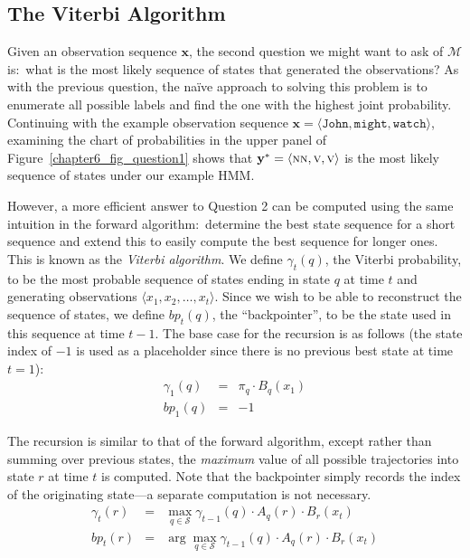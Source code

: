 \subsection{The Viterbi Algorithm}

Given an observation sequence $\mathbf{x}$, the second question we
might want to ask of $\mathcal{M}$ is:\ what is the most likely
sequence of states that generated the observations?  As with the
previous question, the na\"{i}ve approach to solving this problem is
to enumerate all possible labels and find the one with the highest
joint probability.  Continuing with the example observation sequence
$\textbf{x} = \langle \texttt{John} , \texttt{might} , \texttt{watch}
\rangle$, examining the chart of probabilities in the upper panel of
Figure~\ref{chapter6_fig_question1} shows that $\textbf{y}^* = \langle
\textsc{nn}, \textsc{v}, \textsc{v} \rangle$ is the most likely
sequence of states under our example HMM.

However, a more efficient answer to Question 2 can be computed using
the same intuition in the forward algorithm:\ determine the best state
sequence for a short sequence and extend this to easily compute the
best sequence for longer ones.  This is known as the \emph{Viterbi
  algorithm}.  We define $\gamma_t(q)$, the Viterbi probability, to be
the most probable sequence of states ending in state $q$ at time $t$
and generating observations $\langle x_1, x_2, \ldots , x_t \rangle$.
Since we wish to be able to reconstruct the sequence of states, we
define $bp_t(q)$, the ``backpointer'', to be the state used in this
sequence at time $t-1$.  The base case for the recursion is as follows
(the state index of $-1$ is used as a placeholder since there is no
previous best state at time $t=1$):
\begin{eqnarray}
\gamma_1(q) &=& \pi_q \cdot B_q(x_1) \\
bp_1(q) & = & -1
\end{eqnarray}

\noindent The recursion is similar to that of the forward algorithm,
except rather than summing over previous states, the \emph{maximum}
value of all possible trajectories into state $r$ at time $t$ is
computed.  Note that the backpointer simply records the index of the
originating state---a separate computation is not necessary.
\begin{eqnarray}
\gamma_t(r) & = & \max_{q \in \mathcal{S}}  \gamma_{t-1}(q)  \cdot A_q(r) \cdot B_r(x_t)  \\
bp_t(r) & = & \arg \max_{q \in \mathcal{S}} \gamma_{t-1}(q)  \cdot A_q(r) \cdot B_r(x_t)
\end{eqnarray}

